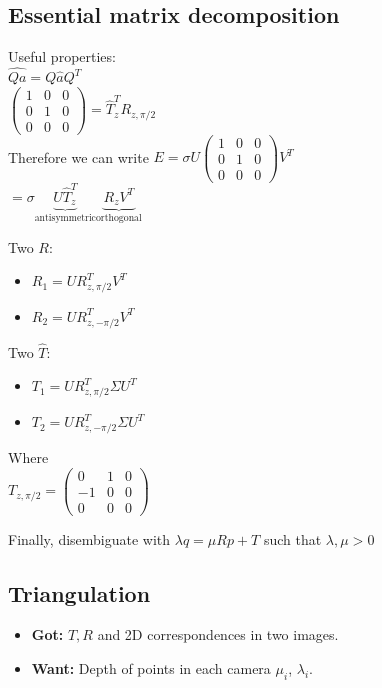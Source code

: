 \subsection*{Essential matrix decomposition}
Useful properties: \\
$\hat{Q a} = Q \hat{a} Q^T$\\
$\begin{pmatrix}
  1 & 0 & 0 \\ 0 & 1 & 0 \\ 0& 0& 0
\end{pmatrix} =\hat{T}^T_z R_{z, \pi/2}$ \\
Therefore we can write
$E = \sigma U
\begin{pmatrix}
  1 & 0 & 0 \\ 0 & 1 & 0 \\ 0& 0& 0
\end{pmatrix} V^T$\\
$=\sigma \underbrace{U \hat{T}^T_z}_{\text{antisymmetric}}
\underbrace{R_z V^T}_{\text{orthogonal}}$

Two $R$:
\begin{itemize}
  \item $R_1 = U R^T_{z, \pi/2} V^T$
  \item $R_2 = U R^T_{z, -\pi/2} V^T$
\end{itemize}
Two $\hat{T}$:
\begin{itemize}
  \item $T_1 = U R^T_{z, \pi/2} \Sigma U^T$
  \item $T_2 = U R^T_{z, -\pi/2} \Sigma U^T$
\end{itemize}

Where\\
$T_{z, \pi/2} = \begin{pmatrix} 
  0 & 1 & 0 \\ -1 & 0 & 0\\ 0 & 0 & 0
\end{pmatrix}$

Finally, disembiguate with $\lambda q = \mu R p + T$ such that $\lambda,
\mu > 0$


\subsection*{Triangulation}
\begin{itemize}
  \item \textbf{Got:} $T, R$ and 2D correspondences in two images.
  \item \textbf{Want:} Depth of points in each camera $\mu_i$, $\lambda_i$.
\end{itemize}

